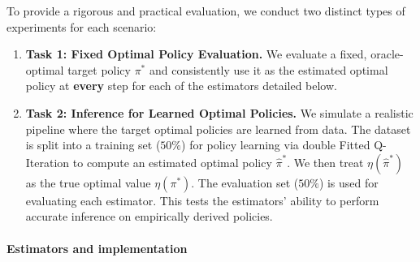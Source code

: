 \documentclass[12pt]{article}
\theoremstyle{remark}\newtheorem{remark}[theorem]{Remark}\theoremstyle{plain}
\begin{document}
To provide a rigorous and practical evaluation, we conduct two distinct types of experiments for each scenario:

\begin{enumerate}

    \item \textbf{Task 1: Fixed Optimal Policy Evaluation.} We evaluate a fixed, oracle-optimal target policy $\pi^*$ and consistently use it as the estimated optimal policy at \textbf{every} step for each of the estimators detailed below. %

    \item \textbf{Task 2: Inference for Learned Optimal Policies.} We simulate a realistic pipeline where the target optimal policies are learned from data.
    The dataset is split into a training set ($50\%$) for policy learning via double Fitted Q-Iteration to compute an estimated optimal policy $\widehat{\pi}^*$. We then treat $\eta(\widehat{\pi}^*)$ as the true optimal value $\eta(\pi^*)$.
    The evaluation set ($50\%$) is used for evaluating each estimator. This tests the estimators' ability to perform accurate inference on empirically derived policies.
\end{enumerate}

\paragraph{Estimators and implementation}\label{sec:sim_estimators}
\end{document}
